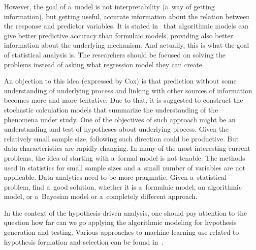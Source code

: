 \begin{multicols}{2}
  However, the goal of a~model is not interpretability (a~way of getting information), but getting useful, accurate information about the relation between the response and
predictor variables. It is stated in~\cite{36-kl} that algorithmic models can
give better predictive accuracy than formulaic models, providing also better
information about the underlying mechanism. And actually, this is what the goal of statistical analysis is.
The researchers should be focused on solving the problems instead of asking
what regression model they can create.

  An objection to this idea (expressed by Cox) is that prediction without some understanding of underlying process and linking with other sources of information
becomes more and more tentative. Due to that, it is suggested to construct the
stochastic calculation models that summarize the understanding of the phenomena under study. One of the objectives of such approach might be an understanding and
test of hypotheses about underlying process. Given the relatively small sample size,
following such direction could be productive. But data characteristics are rapidly changing. In many of the most interesting current problems, the idea of starting with
a~formal model is not tenable. The methods used in statistics for small
sample sizes and a~small number of variables are not applicable.
Data analytics need to be more
pragmatic. Given a~statistical problem, find a~good solution, whether
it is a~formulaic model, an algorithmic model, or a~Bayesian model
 or a~completely different approach.
 {

 }

  In the context of the hypothesis-driven analysis, one should pay attention to the question how far can we go applying the algorithmic modeling for hypothesis
generation and testing. Various approaches to machine learning use related to
hypothesis formation and selection can be found
in~\cite{27-kl, 36-kl, 37-kl}.


\end{multicols}
